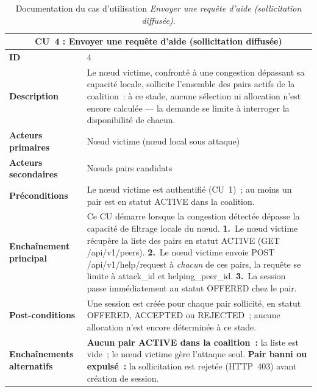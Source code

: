 


\begin{table}[H]
\centering
\renewcommand{\arraystretch}{1.5}
\begin{tabular}{|p{3.5cm}|p{10.5cm}|}
\hline
\multicolumn{2}{|c|}{\textbf{CU~4 : Envoyer une requête d'aide (sollicitation diffusée)}} \\
\hline
\textbf{ID} & 4 \\
\hline
\textbf{Description} & Le nœud victime, confronté à une congestion dépassant sa capacité locale, sollicite l'ensemble des pairs actifs de la coalition~: à ce stade, aucune sélection ni allocation n'est encore calculée — la demande se limite à interroger la disponibilité de chacun. \\
\hline
\textbf{Acteurs primaires} & Nœud victime (nœud local sous attaque) \\
\hline
\textbf{Acteurs secondaires} & Nœuds pairs candidats \\
\hline
\textbf{Préconditions} & Le nœud victime est authentifié (CU~1)~; au moins un pair est en statut {ACTIVE} dans la coalition. \\
\hline
\textbf{Enchaînement principal} &
Ce CU démarre lorsque la congestion détectée dépasse la capacité de filtrage locale du nœud.\newline
\textbf{1.}\ Le nœud victime récupère la liste des pairs en statut {ACTIVE} ({GET /api/v1/peers}).\newline
\textbf{2.}\ Le nœud victime envoie {POST /api/v1/help/request} à \emph{chacun} de ces pairs, la requête se limite à {attack\_id} et {helping\_peer\_id}.\newline
\textbf{3.}\ La session passe immédiatement au statut {OFFERED} chez le pair. \\
\hline
\textbf{Post-conditions} & Une session est créée pour chaque pair sollicité, en statut {OFFERED}, {ACCEPTED} ou {REJECTED}~; aucune allocation n'est encore déterminée à ce stade. \\
\hline
\textbf{Enchaînements alternatifs} &
\textbf{Aucun pair {ACTIVE} dans la coalition~:} la liste est vide~; le nœud victime gère l'attaque seul.\newline
\textbf{Pair banni ou expulsé~:} la sollicitation est rejetée (HTTP~403) avant création de session. \\
\hline
\end{tabular}
\caption{Documentation du cas d'utilisation \textit{Envoyer une requête d'aide (sollicitation diffusée)}.}
\label{tab:cu4}
\end{table}

